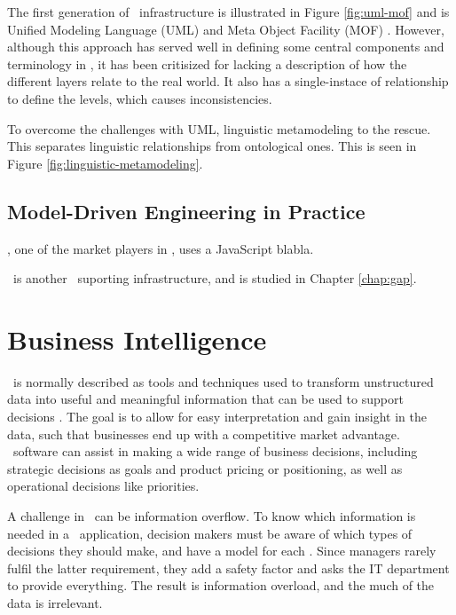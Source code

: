 The first generation of \mdd~infrastructure is illustrated in Figure \ref{fig:uml-mof} and is Unified Modeling Language (UML) and Meta Object Facility (MOF) \cite{Atkinson2003-wr}. However, although this approach has served well in defining some central components and terminology in \mde, it has been critisized for lacking a description of how the different layers relate to the real world. It also has a single-instace of relationship to define the levels, which causes inconsistencies.

To overcome the challenges with UML, linguistic metamodeling to the rescue. This separates linguistic relationships from ontological ones. This is seen in Figure \ref{fig:linguistic-metamodeling}.

\subsection{Model-Driven Engineering in Practice}
\label{sub:Model-Driven Engineering in Practice}
\mendix, one of the market players in \mdd, uses a JavaScript blabla.

\gap~is another \mdd~suporting infrastructure, and is studied in Chapter \ref{chap:gap}.

\section{Business Intelligence}
\label{sec:Business Intelligence}
\bi~is normally described as tools and techniques used to transform unstructured data into useful and meaningful information that can be used to support decisions \cite{Wikipedia_contributors2015-ag}. The goal is to allow for easy interpretation and gain insight in the data, such that businesses end up with a competitive market advantage. \bi~software can assist in making a wide range of business decisions, including strategic decisions as goals and product pricing or positioning, as well as operational decisions like priorities.

A challenge in \bi~can be information overflow. To know which information is needed in a \bi~application, decision makers must be aware of which types of decisions they should make, and have a model for each \cite{Ackoff1999-wk}. Since managers rarely fulfil the latter requirement, they add a safety factor and asks the IT department to provide everything. The result is information overload, and the much of the data is irrelevant. 

